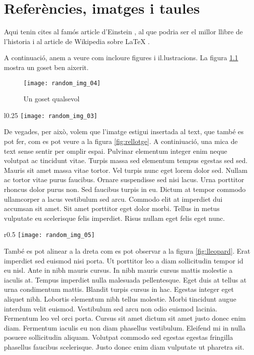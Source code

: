 \chapter{Referències, imatges i taules}
\label{cap:primer}
Aqui tenin cites al famós article d'Einstein \autocite{Einstein05}, al que podria ser el millor llibre de l'historia \Autocite{GMMarquez67} i al article de Wikipedia sobre \LaTeX{} \autocite{Wikipedia_LaTeX}.

A continuació, anem a veure com incloure figures i il.lustracions. La figura \ref{fig:gos} mostra un goset ben aixerit.
\begin{figure}[h]
    \centering
    \texttt{[image: random\_img\_04]}
    \caption{Un goset qualsevol}
    \label{fig:gos}
\end{figure}

\begin{wrapfigure}{l}{0.25\textwidth}
    \centering
    \texttt{[image: random\_img\_03]}
    \caption{El temps vola}
    \label{fig:rellotge}
\end{wrapfigure}

De vegades, per això, volem que l'imatge estigui insertada al text, que també es pot fer, com es pot veure a la figura \ref{fig:rellotge}. A continiuació, una mica de text sense sentir per omplir espai. Pulvinar elementum integer enim neque volutpat ac tincidunt vitae. Turpis massa sed elementum tempus egestas sed sed. Mauris sit amet massa vitae tortor. Vel turpis nunc eget lorem dolor sed. Nullam ac tortor vitae purus faucibus. Ornare suspendisse sed nisi lacus. Urna porttitor rhoncus dolor purus non. Sed faucibus turpis in eu. Dictum at tempor commodo ullamcorper a lacus vestibulum sed arcu. Commodo elit at imperdiet dui accumsan sit amet. Sit amet porttitor eget dolor morbi. Tellus in metus vulputate eu scelerisque felis imperdiet. Risus nullam eget felis eget nunc.

\begin{wrapfigure}{r}{0.5\textwidth}
    \centering
    \texttt{[image: random\_img\_05]}
    \caption{El lleopard}
    \label{fig:lleopard}
\end{wrapfigure}
També es pot alinear a la dreta com es pot observar a la figura \ref{fig:lleopard}. Erat imperdiet sed euismod nisi porta. Ut porttitor leo a diam sollicitudin tempor id eu nisl. Ante in nibh mauris cursus. In nibh mauris cursus mattis molestie a iaculis at. Tempus imperdiet nulla malesuada pellentesque. Eget duis at tellus at urna condimentum mattis. Blandit turpis cursus in hac. Egestas integer eget aliquet nibh. Lobortis elementum nibh tellus molestie. Morbi tincidunt augue interdum velit euismod. Vestibulum sed arcu non odio euismod lacinia. Fermentum leo vel orci porta. Cursus sit amet dictum sit amet justo donec enim diam. Fermentum iaculis eu non diam phasellus vestibulum. Eleifend mi in nulla posuere sollicitudin aliquam. Volutpat commodo sed egestas egestas fringilla phasellus faucibus scelerisque. Justo donec enim diam vulputate ut pharetra sit.

